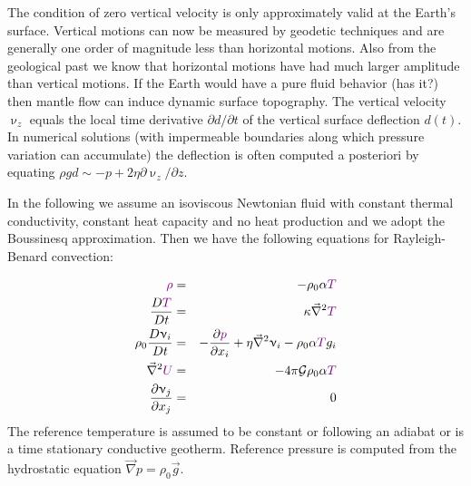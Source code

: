 The condition of zero vertical velocity is only approximately valid at the Earth’s surface.
Vertical motions can now be measured by geodetic techniques and are generally one
order of magnitude less than horizontal motions. Also from the geological past we know
that horizontal motions have had much larger amplitude than vertical motions. If the
Earth would have a pure fluid behavior (has it?) then mantle flow can induce dynamic
surface topography. The vertical velocity $\upnu_z$ equals the local time derivative
$\partial d/\partial t$ of the vertical surface deflection $d(t)$. 
In numerical solutions (with impermeable boundaries
along which pressure variation can accumulate) the deflection is often computed a
posteriori by equating $\rho g d \sim -p + 2\eta \partial \upnu_z/\partial z$.

In the following we assume an isoviscous Newtonian fluid with constant thermal
conductivity, constant heat capacity and no heat production and we adopt the Boussinesq
approximation. Then we have the following equations for Rayleigh-Benard convection:

\begin{eqnarray}
{\color{violet} \rho} &=& -\rho_0 \alpha {\color{violet}T} \\
\frac{D {\color{violet}T}}{Dt} &=& \kappa \vec\nabla^2 {\color{violet}T} \\
\rho_0 \frac{D\upnu_i}{Dt} &=& -\frac{\partial {\color{violet} p}}{\partial x_i}
+ \eta \vec\nabla^2 \upnu_i - \rho_0 \alpha {\color{violet}T} g_i \\
\vec\nabla^2 {\color{violet}U} &=& -4 \pi {\cal G} \rho_0 \alpha {\color{violet}T} \\
\frac{\partial \upnu_j}{\partial x_j} &=& 0
\end{eqnarray}
The reference temperature is assumed to be constant or following an adiabat or is a time
stationary conductive geotherm. Reference pressure is computed from the hydrostatic
equation $\vec\nabla p = \rho_0 \vec{g}$.

